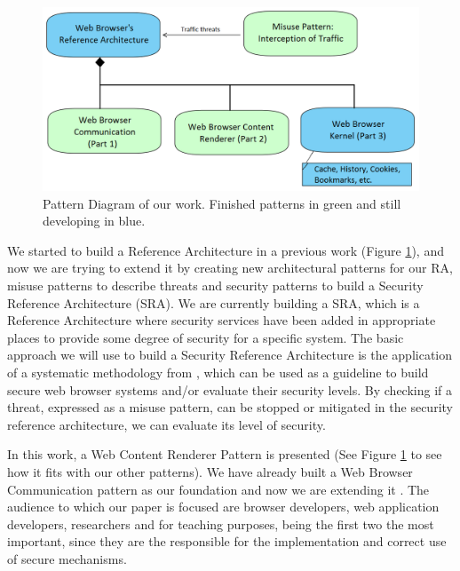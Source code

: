 \documentclass[prodmode,acmtecs]{acmsmall}
\begin{document}
    \begin{figure}[h!t]
      \vspace*{-0.3cm}
      \centering
      \hspace{0.5cm}\includegraphics[scale=0.45]{figures/relations-finish.png}
      \caption{Pattern Diagram of our work. Finished patterns in green and still developing in blue.}
      \label{fig:relations}
    \end{figure}

We started to build a Reference Architecture in a previous work (Figure \ref{fig:relations}), and now we are trying to extend it by creating new architectural patterns for our RA, misuse patterns to describe threats and security patterns to build a Security Reference Architecture (SRA). We are currently building a SRA, which is a Reference Architecture where security services have been added in appropriate places to provide some degree of security for a specific system. The basic approach we will use to build a Security Reference Architecture is the application of a systematic methodology from \cite{fernandez2006methodology,Fernandez2011,Fernandez2015}, which can be used as a guideline to build secure web browser systems and/or evaluate their security levels. By checking if a threat, expressed as a misuse pattern, can be stopped or mitigated in the security reference architecture, we can evaluate its level of security.

In this work, a Web Content Renderer Pattern is presented (See Figure \ref{fig:relations} to see how it fits with our other patterns). We have already built a Web Browser Communication pattern as our foundation and now we are extending it \cite{silva2015}. The audience to which our paper is focused are browser developers, web application developers, researchers and for teaching purposes, being the first two the most important, since they are the responsible for the implementation and correct use of secure mechanisms. 
\end{document}
